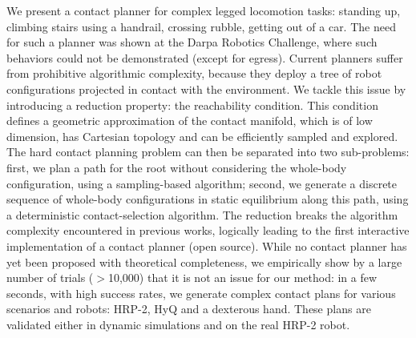 We present a contact planner for complex legged locomotion tasks: standing up, climbing stairs using a handrail, crossing rubble, getting out of a car. The need for such a planner was shown at the Darpa Robotics Challenge, where such behaviors
could not be demonstrated (except for egress).
%
Current planners suffer from prohibitive algorithmic complexity, because they deploy a tree of robot configurations projected in contact with the environment.
%
We tackle this issue by introducing a reduction property: the reachability condition. 
This condition defines a geometric approximation of the contact manifold, which is of low dimension, has Cartesian topology and can be efficiently sampled and explored.
%
The hard contact planning problem can then be separated into two sub-problems: 
first, we plan a path for the root without considering the whole-body configuration, using a sampling-based algorithm; 
second, we generate a discrete sequence of whole-body configurations in static equilibrium along this path, using a deterministic contact-selection algorithm. 
%
%
The reduction breaks the algorithm complexity encountered in previous works, logically leading to the  first interactive implementation of a contact planner (open source).
%
While no contact planner has yet been proposed with theoretical completeness, we empirically show by a large number of trials ($>$10,000) that it is not an issue for our method:
in a few seconds, with high success rates, we generate complex contact plans for various scenarios and robots: HRP-2, HyQ and a dexterous hand. 
These plans are validated either in dynamic simulations and on the real HRP-2 robot.
